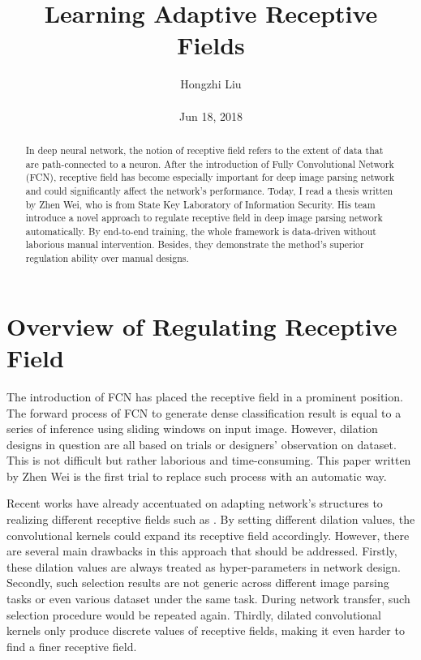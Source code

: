 \documentclass[10pt,twocolumn,letterpaper]{article}
\title{Learning Adaptive Receptive Fields}
\author{Hongzhi Liu\\\\
Jun 18, 2018}
\begin{document}
\maketitle
\begin{abstract}
	In deep neural network, the notion of receptive field refers to the extent of data that are path-connected to a neuron. After the introduction of Fully Convolutional Network (FCN), receptive field has become especially important for deep image parsing network and could significantly affect the network's performance. Today, I read a thesis written by Zhen Wei, who is from State Key Laboratory of Information Security. His team introduce a novel approach to regulate receptive field in deep image parsing network automatically. By end-to-end training, the whole framework is data-driven without laborious manual intervention. Besides, they demonstrate the method's superior regulation ability over manual designs.
\end{abstract}
\section{Overview of Regulating Receptive Field}

The introduction of FCN \cite{Long2015Fully} has placed the receptive field in a prominent position. The forward process of FCN to generate dense classification result is equal to a series of inference using sliding windows on input image. However, dilation designs in question are all based on trials or designers' observation on dataset. This is not difficult but rather laborious and time-consuming. This paper written by Zhen Wei is the first trial to replace such process with an automatic way.

Recent works have already accentuated on adapting network's structures to realizing different receptive fields such as \cite{DBLP:journals/corr/ChenPKMY14}. By setting different dilation values, the convolutional kernels could expand its receptive field accordingly. However, there are several main drawbacks in this approach that should be addressed. Firstly, these dilation values are always treated as hyper-parameters in network design. Secondly, such selection results are not generic across different image parsing tasks or even various dataset under the same task. During network transfer, such selection procedure would be repeated again. Thirdly, dilated convolutional kernels only produce discrete values of receptive fields, making it even harder to find a finer receptive field.
\end{document}
